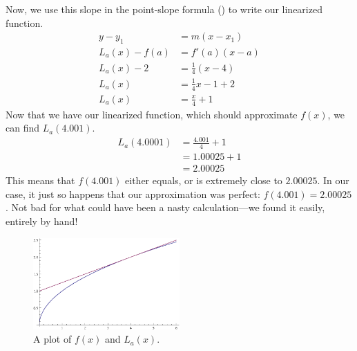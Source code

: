 \begin{ex}
\begin{sol}
    Now, we use this slope in the point-slope formula () to write our linearized function.
    \begin{align*}
      y-y_1 &= m (x-x_1) \\
      L_a(x)-f(a) &= f'(a) (x-a) \\
      L_a(x)-2 &= \frac{1}{4}(x-4) \\
      L_a(x) &= \frac{1}{4}x-1+2 \\
      L_a(x)&= \frac{x}{4}+1
    \end{align*}
    Now that we have our linearized function, which should approximate $f(x)$, we can find $L_a (4.001)$.
    \begin{align*}
      L_a(4.0001) &= \frac{4.001}{4}+1 \\
      &= 1.00025 +1 \\
      &= 2.00025
    \end{align*}
    This means that $f(4.001)$ either equals, or is extremely close to $2.00025$.
    In our case, it just so happens that our approximation was perfect: $f(4.001)=2.00025$.
    Not bad for what could have been a nasty calculation---we found it easily, entirely by hand!
    \begin{figure}[h]
      \begin{center}
        \includegraphics[width=0.5\textwidth]{continuous/derivatives/lin_ex1.eps}
      \end{center}
      \caption{A plot of $f(x)$ and $L_a(x)$.}
    \end{figure}
  \end{sol}
\end{ex}

